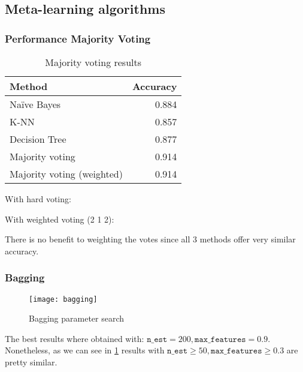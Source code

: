 
\subsection{Meta-learning algorithms}%
\label{sub:meta}

\subsubsection{Performance Majority Voting}

\begin{table}[H]
\centering
\caption{Majority voting results}
\begin{tabular}{lr}
\toprule
Method & Accuracy \\
\midrule
Na\"ive Bayes & 0.884 \\
K-NN & 0.857 \\
Decision Tree & 0.877 \\
\addlinespace[0.5em]
Majority voting & 0.914 \\
Majority voting (weighted)  & 0.914 \\
\bottomrule
\end{tabular}
\end{table}


With hard voting:

\noindent
With weighted voting (2 1 2):

There is no benefit to weighting the votes since all 3 methods offer very similar accuracy.
 
\pagebreak
\subsubsection{Bagging}

\begin{figure}[H]
\centering
\texttt{[image: bagging]}
\caption{Bagging parameter search}%
\label{fig:bagging}
\end{figure}

The best results where obtained with: $\texttt{n\_est} = 200, \texttt{max\_features} = 0.9$. Nonetheless, as we
can see in \cref{fig:bagging} results with $\texttt{n\_est} \geq 50, \texttt{max\_features} \geq 0.3$ are pretty
similar.


